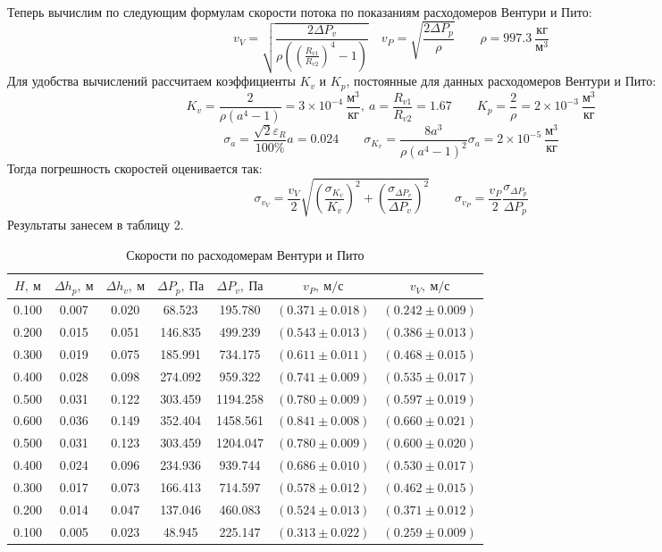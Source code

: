 \documentclass[a4paper, 12pt]{article}
\begin{document}
\paragraph{}
Теперь вычислим по следующим формулам скорости потока по показаниям расходомеров Вентури и Пито:
\[ v_V = \sqrt{\frac{2 \Delta P_v}{\rho ((\frac{R_{v1}}{R_{v2}})^4 - 1)}} \quad v_P = \sqrt{\frac{2 \Delta P_p}{\rho}} \qquad \rho = 997.3 \: \frac{кг}{м^3}\]
Для удобства вычислений рассчитаем коэффициенты $K_v$ и $K_p$, постоянные для данных расходомеров Вентури и Пито:
\[ K_v = \frac{2}{\rho (a^4 - 1)} = 3 \times 10^{-4} \: \frac{м^3}{кг}, \: a = \frac{R_{v1}}{R_{v2}} = 1.67 \qquad K_p = \frac{2}{\rho} = 2 \times 10^{-3} \: \frac{м^3}{кг}\]
\[ \sigma_a = \frac{\sqrt{2} \varepsilon_R}{100 \%} a = 0.024 \qquad \sigma_{K_v} = \frac{8 a^3}{\rho (a^4 - 1)^2}\sigma_a = 2 \times 10^{-5} \: \frac{м^3}{кг}\]
Тогда погрешность скоростей оценивается так:
\[ \sigma_{v_V} = \frac{v_V}{2} \sqrt{\left(\frac{\sigma_{K_v}}{K_v}\right)^2 + \left(\frac{\sigma_{\Delta P_v}}{\Delta P_v}\right)^2} \qquad \sigma_{v_P} = \frac{v_P}{2} \frac{\sigma_{\Delta P_p}}{\Delta P_p}\]
Результаты занесем в таблицу 2.
 \begin{table}[h!]
       
        \begin{center}
         \begin{tabular}{|c|c|c|c|c|c|c|}
            \hline
 $H, \: м$ & $\Delta h_p, \: м$ & $\Delta h_v, \: м $  & $\Delta P_p, \: Па$ & $\Delta P_v, \: Па$ & $v_P, \: м/с$ & $v_V, \: м/с$\\
 \hline
 0.100 & 0.007 & 0.020 & 68.523 & 195.780 & $( 0.371 \pm 0.018 )$ & $( 0.242 \pm 0.009 )$ \\
\hline
 0.200 & 0.015 & 0.051 & 146.835 & 499.239 & $( 0.543 \pm 0.013)$ & $(0.386 \pm 0.013)$ \\
\hline
 0.300 & 0.019 & 0.075 & 185.991 & 734.175 & $(0.611 \pm 0.011)$ & $(0.468 \pm 0.015)$ \\
\hline
 0.400 & 0.028 & 0.098 & 274.092 & 959.322 & $(0.741 \pm 0.009)$ & $(0.535 \pm 0.017)$\\
\hline
 0.500 & 0.031 & 0.122 & 303.459 & 1194.258 & $(0.780 \pm 0.009 )$  & $(0.597 \pm 0.019)$ \\
\hline
 0.600 & 0.036 & 0.149 & 352.404 & 1458.561 & $(0.841 \pm 0.008)$ & $(0.660 \pm 0.021)$ \\
 \hline
 0.500 & 0.031 & 0.123 & 303.459 & 1204.047 & $(0.780 \pm 0.009)$ & $(0.600 \pm 0.020)$\\
\hline
 0.400 & 0.024 & 0.096 & 234.936 & 939.744 & $(0.686 \pm 0.010)$ & $(0.530 \pm 0.017)$ \\
\hline
 0.300 & 0.017 & 0.073 & 166.413 & 714.597 & $(0.578 \pm 0.012)$ & $(0.462 \pm 0.015)$\\
\hline
 0.200 & 0.014 & 0.047 & 137.046 & 460.083 & $(0.524 \pm 0.013)$& $(0.371 \pm 0.012)$\\
 \hline
 0.100 & 0.005 & 0.023 & 48.945 & 225.147 & $(0.313 \pm 0.022)$ & $(0.259 \pm 0.009)$\\
\hline
 \end{tabular}
         \end{center}
         \caption{Скорости по расходомерам Вентури и Пито}
\end{table}
\end{document}

